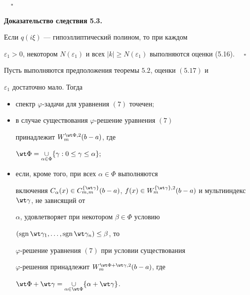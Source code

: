 $\quad\square$ 


\medskip 


 


{\bf Доказательство следствия 5.3.} 


Если $q(i\xi)$ --- гипоэллиптический полином, то при каждом 


$\varepsilon_1>0$, некотором $N(\varepsilon_1)$ и всех $|k|\ge 


N(\varepsilon_1)$ выполняются оценки (5.16). $\quad\square$ 


 


\begin{thms} 


Пусть выполняются предположения теоремы $5.2$, оценки $(5.17)$ и 


$\varepsilon_1$ достаточно мало. Тогда 


\begin{itemize} 


\item[1.] спектр $\varphi$-задачи для уравнения $(7)$ точечен$;$ 


\item[2.] в случае существования $\varphi$-решение уравнения $(7)$ 


принадлежит $W^{\wt\Phi,2}_m(b-a)$, где 


$\wt\Phi=\mathop{\cup}\limits_{\alpha\in\Phi}\{\gamma: 


0\le\gamma\le\alpha\};$ 


\item[3.] если, кроме того, при всех $\alpha\in\Phi$ выполняются 


включения $C_\alpha(x)\in C^{\{\wt\gamma\}}_{m,m}(b-a)$, $f(x)\in 


W^{\{\wt\gamma\},2}_m(b-a)$ и мультииндекс $\wt\gamma$, не зависящий от 


$\alpha$, удовлетворяет при некотором $\beta\in\Phi$ условию 


$(\sgn\wt\gamma_1,\dotsc,\sgn\wt\gamma_n)\le\beta$, то 


$\varphi$-решение уравнения $(7)$ при условии существования 


$\varphi$-решения принадлежит $W^{\wt\Phi+\wt\gamma,2}_m(b-a)$, где 


$\wt\Phi+\wt\gamma=\mathop{\cup}\limits_{\alpha\in\wt\Phi} 


\{\alpha+\wt\gamma\}$. 


\end{itemize} 


\end{thms} 


